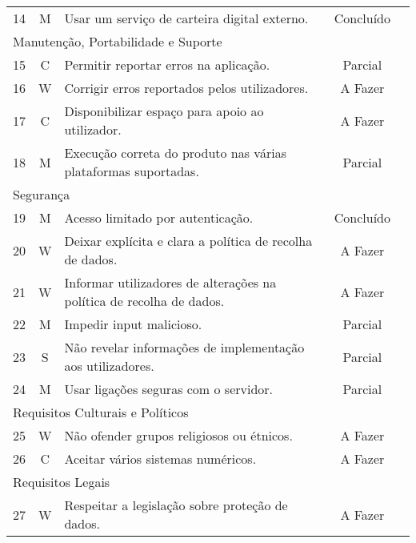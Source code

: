 \begin{center}
\begin{longtable}{@{}lcp{}cp{}@{}}
    14  & M & Usar um serviço de carteira digital externo. & Concluído &  \\
    \multicolumn{5}{l}{\color{gray} Manutenção, Portabilidade e Suporte} \\
    15  & C & Permitir reportar erros na aplicação. & Parcial &  \\
    16  & W & Corrigir erros reportados pelos utilizadores. & A Fazer &  \\
    17  & C & Disponibilizar espaço para apoio ao utilizador. & A Fazer &  \\
    18  & M & Execução correta do produto nas várias plataformas suportadas. & Parcial &  \\
    \multicolumn{5}{l}{\color{gray} Segurança} \\
    19  & M & Acesso limitado por autenticação. & Concluído &  \\
    20  & W & Deixar explícita e clara a política de recolha de dados. & A Fazer &  \\
    21  & W & Informar utilizadores de alterações na política de recolha de dados. & A Fazer &  \\
    22  & M & Impedir input malicioso. & Parcial &  \\
    23  & S & Não revelar informações de implementação aos utilizadores. & Parcial &  \\
    24  & M & Usar ligações seguras com o servidor. & Parcial &  \\
    \multicolumn{5}{l}{\color{gray} Requisitos Culturais e Políticos} \\
    25  & W & Não ofender grupos religiosos ou étnicos. & A Fazer &  \\
    26  & C & Aceitar vários sistemas numéricos. & A Fazer &  \\
    \multicolumn{5}{l}{\color{gray} Requisitos Legais} \\
    27  & W & Respeitar a legislação sobre proteção de dados. & A Fazer & 
\end{longtable}
\end{center}
